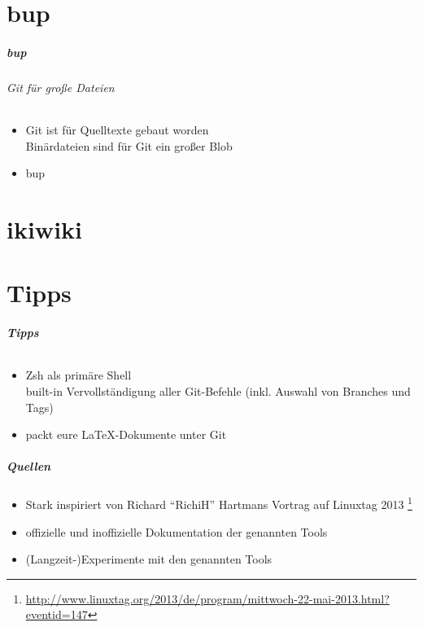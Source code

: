 \documentclass[ngerman,hyperref={pdfpagelabels=false}]{beamer}
\begin{document}
\part{bup}
\makepart

\begin{frame}[label=bup]
  \frametitle{bup}
  \framesubtitle{Git für große Dateien}
  \begin{itemize}
    \item Git ist für Quelltexte gebaut worden\\
      {\scriptsize Binärdateien sind für Git ein großer Blob}
    \item bup 
  \end{itemize}
\end{frame}


\part{ikiwiki}
\makepart

\begin{frame}[label=ikiwiki]
  \frametitle{}
  \framesubtitle{}
  
\end{frame}


\part{Tipps}
\makepart

\begin{frame}[label=tipps]
  \frametitle{Tipps}
  \framesubtitle{}
  \begin{itemize}
    \item Zsh als primäre Shell\\
      {\scriptsize built-in Vervollständigung aller Git-Befehle (inkl. Auswahl von Branches und Tags)}
    \item packt eure \LaTeX-Dokumente unter Git
  \end{itemize}
\end{frame}


\begin{frame}
  \frametitle{Quellen}
  \begin{itemize}
    \item Stark inspiriert von Richard ``RichiH'' Hartmans Vortrag auf Linuxtag 2013
      \footnote{\tiny\url{http://www.linuxtag.org/2013/de/program/mittwoch-22-mai-2013.html?eventid=147}}
    \item offizielle und inoffizielle Dokumentation der genannten Tools
    \item (Langzeit-)Experimente mit den genannten Tools
  \end{itemize}
\end{frame}
\end{document}
